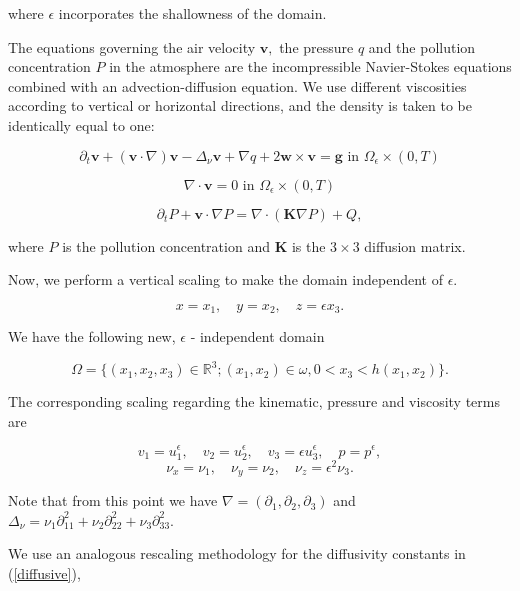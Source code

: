 \documentclass[11pt]{article}
\begin{document}
where $\epsilon$ incorporates the shallowness of the domain.

The equations governing the air velocity $\mathbf{v}, $ the pressure $q$ and the pollution concentration $P$ in the atmosphere are the incompressible Navier-Stokes equations combined with an advection-diffusion equation. We use different viscosities according to vertical or horizontal directions, and the density is taken to be identically equal to one:

\begin{equation} \label{originalEQ-V}
  \partial_t \mathbf{v} + (\mathbf{v} \cdot \nabla)\mathbf{v} -\Delta_{\nu} \mathbf{v} + \nabla q + 2 \mathbf{w} \times \mathbf{v}= \mathbf{g} \text{ in } \Omega_{\epsilon} \times (0,T)
\end{equation}
    
\begin{equation} \label{originalEQ-I}
  \nabla \cdot \mathbf{v} = 0 \text{ in } \Omega_{\epsilon} \times (0,T)
\end{equation}
    
\begin{equation} \label{diffusive}
  \partial_t P + \mathbf{v} \cdot \nabla P = \nabla \cdot (\mathbf{K} \nabla P) + Q,
\end{equation}

where $P$ is the pollution concentration and $\mathbf{K}$ is the $3 \times 3$ diffusion matrix.

Now, we perform a vertical scaling to make the domain independent of $\epsilon.$

    \[x=x_1, \quad y=x_2, \quad z=\epsilon x_3. \]
    
We have the following new, $\epsilon$ - independent domain
    
    \[ \Omega =  \{(x_1,x_2,x_3) \in \mathbb{R}^3 ; (x_1,x_2) \in \omega, 0 < x_3 < h (x_1 , x_2) \}.\]
    
The corresponding scaling regarding the kinematic, pressure and viscosity terms are
     
    \[v_1 = u_1^{\epsilon}, \quad v_2 = u_2^{\epsilon}, \quad v_3 = \epsilon u_3^{\epsilon}, \quad p = p^{\epsilon}, \]
    \[\nu_x = \nu_1, \quad \nu_y = \nu_2 , \quad \nu_z = \epsilon ^ 2\nu_3. \]
    
Note that from this point we have $\nabla = (\partial_1, \partial_2, \partial_3) $ and $ \Delta_\nu = \nu_1 \partial^2_{11} + \nu_2 \partial^2_{22}  + \nu_3 \partial^2_{33} $. 
    
We use an analogous rescaling methodology for the diffusivity constants in (\ref{diffusive}),
    
\end{document}
